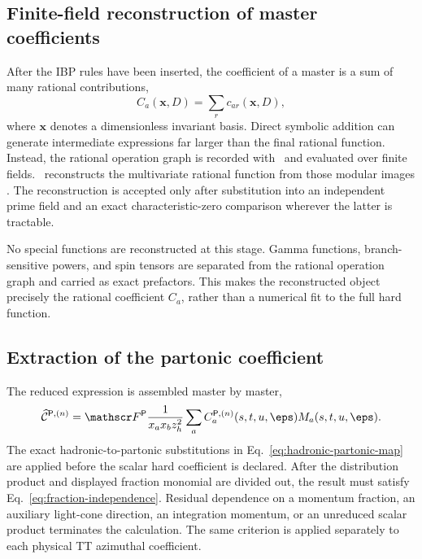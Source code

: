 \subsection{Finite-field reconstruction of master coefficients}

After the IBP rules have been inserted, the coefficient of a master is a sum
of many rational contributions,
\begin{equation}
 C_a(\boldsymbol x,D)
 =\sum_{r}c_{ar}(\boldsymbol x,D),
 \label{eq:master-coefficient-sum}
\end{equation}
where $\boldsymbol x$ denotes a dimensionless invariant basis.  Direct
symbolic addition can generate intermediate expressions far larger than the
final rational function.  Instead, the rational operation graph is recorded
with \Ratracer\ and evaluated over finite fields.  \FireFly\ reconstructs the
multivariate rational function from those modular images
\cite{Magerya:2022bcf,Klappert:2019emp}.  The reconstruction is accepted only
after substitution into an independent prime field and an exact
characteristic-zero comparison wherever the latter is tractable.

No special functions are reconstructed at this stage.  Gamma functions,
branch-sensitive powers, and spin tensors are separated from the rational
operation graph and carried as exact prefactors.  This makes the reconstructed
object precisely the rational coefficient $C_a$, rather than a numerical
fit to the full hard function.

\subsection{Extraction of the partonic coefficient}

The reduced expression is assembled master by master,
\begin{equation}
 \widehat{\mathcal C}^{\mathsf P,(n)}
 =\mathscr F^{\mathsf P}
 \frac{1}{x_ax_bz_h^2}
 \sum_a C_a^{\mathsf P,(n)}(s,t,u,\eps)M_a(s,t,u,\eps).
 \label{eq:post-ibp-hard-coefficient}
\end{equation}
The exact hadronic-to-partonic substitutions in
Eq.~\eqref{eq:hadronic-partonic-map} are applied before the scalar hard
coefficient is declared.  After the distribution product and displayed
fraction monomial are divided out, the result must satisfy
Eq.~\eqref{eq:fraction-independence}.  Residual dependence on a momentum
fraction, an auxiliary light-cone direction, an integration momentum, or an
unreduced scalar product terminates the calculation.  The same criterion is
applied separately to each physical TT azimuthal coefficient.
